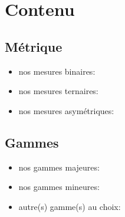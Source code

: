 \documentclass[11pt]{scrreprt}
\begin{document}
\section{Contenu}

\subsection{Métrique}
\begin{itemize}
\item nos mesures binaires:
\item nos mesures ternaires:
\item  nos mesures asymétriques: 
\end{itemize}


\subsection{Gammes}

\begin{itemize}
\item nos gammes majeures: 
\item nos gammes mineures: 
\item autre(s) gamme(s) au choix:
\end{itemize}
\end{document}
